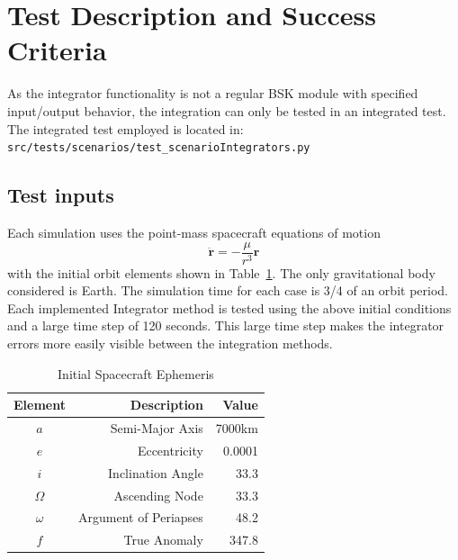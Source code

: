 
\section{Test Description and Success Criteria}

As the integrator functionality is not a regular BSK module with specified input/output behavior, the integration can only be tested in an integrated test.
The integrated test employed is located in:\\

{\tt src/tests/scenarios/test\_scenarioIntegrators.py}
\\

\subsection{Test inputs}
Each simulation uses the point-mass spacecraft equations of motion
\begin{equation}
	\ddot{\bm r} = - \frac{\mu}{r^{3}}{\bm r}
\end{equation}
with the initial orbit elements shown in Table~\ref{tbl:oeInitial}.  The only gravitational body considered is Earth.  The simulation time for each case is 3/4 of an orbit period.  Each implemented Integrator method is tested using the above initial conditions and a large time step of 120 seconds.  This large time step makes the integrator errors more easily visible between the integration methods.


\begin{table}[htbp]
	\caption{Initial Spacecraft Ephemeris}
	\label{tbl:oeInitial}
	\centering \fontsize{10}{10}\selectfont
	\begin{tabular}{c | r | r } %
		\hline
		\hline
		Element    & Description & Value \\
		\hline
		$a$      & Semi-Major Axis & 7000km \\
		$e$ & Eccentricity     &  0.0001 \\
		$i$       & Inclination Angle  & 33.3\dg \\
		$\Omega$       & Ascending Node   & 33.3\dg \\
		$\omega$       & Argument of Periapses  & 48.2\dg \\
		$f$       & True Anomaly   & 347.8\dg \\
		\hline
		\hline
	\end{tabular}
\end{table}



